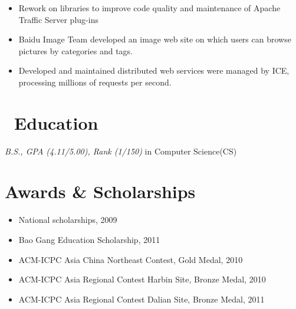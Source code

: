 \documentclass{resume}
\begin{document}
 {}{}
\begin{itemize}
    \item Rework on libraries to improve code quality and maintenance of Apache Traffic Server plug-ins
\end{itemize}

 {}{}
\begin{itemize}
    \item Baidu Image Team developed an image web site on which users can browse pictures by categories and tags.
\end{itemize}

 {}{}
\begin{itemize}
    \item  Developed and maintained distributed web services were managed by ICE, processing millions of requests per second.
\end{itemize}

\section{\faGraduationCap\ Education}
\textit{B.S.,  GPA (4.11/5.00), Rank (1/150)} in Computer Science(CS)

\section{Awards \& Scholarships}
\begin{itemize}
    \item National scholarships, 2009
    \item Bao Gang Education Scholarship, 2011
    \item ACM-ICPC Asia China Northeast Contest, Gold Medal, 2010
    \item ACM-ICPC Asia Regional Contest Harbin Site, Bronze Medal, 2010
    \item ACM-ICPC Asia Regional Contest Dalian Site, Bronze Medal, 2011
\end{itemize}
\end{document}
